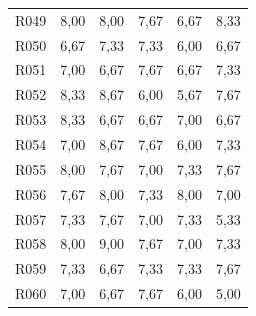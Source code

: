 {\begin{longtable}{L{1.05cm}R{2.05cm}R{1.9cm}R{2.15cm}R{1.7cm}R{1.95cm}}
R049 & 8,00 & 8,00 & 7,67 & 6,67 & 8,33 \\
R050 & 6,67 & 7,33 & 7,33 & 6,00 & 6,67 \\
R051 & 7,00 & 6,67 & 7,67 & 6,67 & 7,33 \\
R052 & 8,33 & 8,67 & 6,00 & 5,67 & 7,67 \\
R053 & 8,33 & 6,67 & 6,67 & 7,00 & 6,67 \\
R054 & 7,00 & 8,67 & 7,67 & 6,00 & 7,33 \\
R055 & 8,00 & 7,67 & 7,00 & 7,33 & 7,67 \\
R056 & 7,67 & 8,00 & 7,33 & 8,00 & 7,00 \\
R057 & 7,33 & 7,67 & 7,00 & 7,33 & 5,33 \\
R058 & 8,00 & 9,00 & 7,67 & 7,00 & 7,33 \\
R059 & 7,33 & 6,67 & 7,33 & 7,33 & 7,67 \\
R060 & 7,00 & 6,67 & 7,67 & 6,00 & 5,00 \\
\end{longtable}
}
